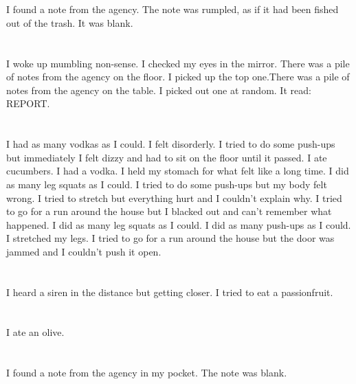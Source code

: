 \documentclass{article}
\begin{document}
    \section{}
    I found a note from the agency. The note was rumpled, as if it had been fished out of the trash. It was blank.  
    \newpage
    
    \section{}
    I woke up mumbling non-sense. I checked my eyes in the mirror. There was a pile of notes from the agency on the floor. I picked up the top one.There was a pile of notes from the agency on the table. I picked out one at random. It read: REPORT.  
    \newpage
    
    \section{}
    I had as many vodkas as I could. I felt disorderly. I tried to do some push-ups but immediately I felt dizzy and had to sit on the floor until it passed. I ate cucumbers. I had a vodka. I held my stomach for what felt like a long time.  I did as many leg squats as I could.  I tried to do some push-ups but my body felt wrong.  I tried to stretch but everything hurt and I couldn't explain why.  I tried to go for a run around the house but I blacked out and can't remember what happened.   I did as many leg squats as I could.  I did as many push-ups as I could.  I stretched my legs.  I tried to go for a run around the house but the door was jammed and I couldn't push it open.  
    \newpage
    
    \section{}
    I heard a siren in the distance but getting closer. I tried to eat a passionfruit.  
    \newpage
    
    \section{}
    I ate an olive.  
    \newpage
    
    \section{}
    I found a note from the agency in my pocket. The note was blank.  
    \newpage
    
\end{document}
